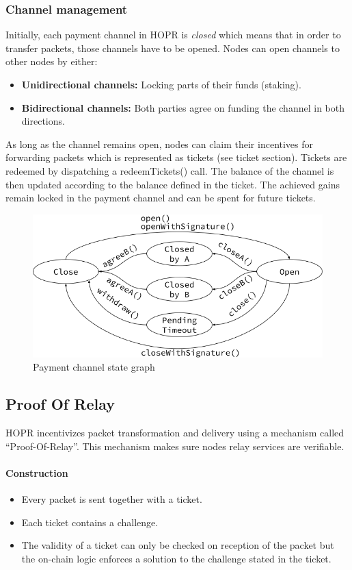 \subsubsection{Channel management}
Initially, each payment channel in HOPR is \textit{closed} which means that in order to transfer packets, those channels have to be opened. Nodes can open channels to other nodes by either:
\begin{itemize}
    \item \textbf{Unidirectional channels:} Locking parts of their funds (staking).
    \item \textbf{Bidirectional channels:} Both parties agree on funding the channel in both directions.
\end{itemize}
As long as the channel remains open, nodes can claim their incentives for forwarding packets which is represented as tickets (see ticket section). Tickets are redeemed by dispatching a redeemTickets() call. The balance of the channel is then updated according to the balance defined in the ticket. The achieved gains remain locked in the payment channel and can be spent for future tickets.

\begin{figure}[H]
    \centering
    \includegraphics[width=\textwidth,keepaspectratio]{../yellowpaper/images/payment_channel_graph.png}
    \caption{Payment channel state graph}
    \label{fig:Payment channel graph}
\end{figure}

\subsection{Proof Of Relay}

HOPR incentivizes packet transformation and delivery using a mechanism called “Proof-Of-Relay”.
This mechanism makes sure nodes relay services are verifiable.
\paragraph{Construction}
\begin{itemize}
    \item Every packet is sent together with a ticket.
    \item Each ticket contains a challenge.
    \item The validity of a ticket can only be checked on reception of the packet but the on-chain logic enforces a solution to the challenge stated in the ticket.
\end{itemize}

